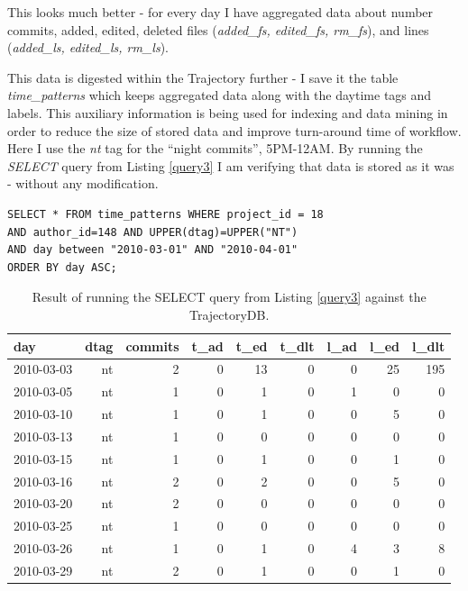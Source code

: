 \documentclass[a4paper,10pt]{article}
\numberwithin{equation}{subsection}
\begin{document}
This looks much better - for every day I have aggregated data about number commits, added, edited, deleted files (\emph{added\_fs, edited\_fs, rm\_fs}),
and lines (\emph{added\_ls, edited\_ls, rm\_ls}).

This data is digested within the Trajectory further - I save it the table \emph{time\_patterns} which keeps aggregated data along with the daytime tags
and labels. This auxiliary information is being used for indexing and data mining in order to reduce the size of stored data and improve turn-around
time of workflow. Here I use the \emph{nt} tag for the ``night commits'', 5PM-12AM. By running the \emph{SELECT} query from Listing \ref{query3} I am 
verifying that data is stored as it was - without any modification.
\noindent\begin{minipage}{\textwidth}
\begin{lstlisting}[label=query3,caption=Data summary from time\_patterns table]
SELECT * FROM time_patterns WHERE project_id = 18
AND author_id=148 AND UPPER(dtag)=UPPER("NT")
AND day between "2010-03-01" AND "2010-04-01"
ORDER BY day ASC;
\end{lstlisting}
\end{minipage}
\begin{table}[h]
\noindent\begin{minipage}{\textwidth}
  \centering
  \caption{Result of running the SELECT query from Listing \ref{query3} against the TrajectoryDB.}
  \begin{tabularx}{0.8\textwidth}{ | X | r | r | r | r | r | r | r | r |}
  \hline           
day & dtag & commits & t\_ad & t\_ed & t\_dlt & l\_ad & l\_ed & l\_dlt\\ 
\hline           
2010-03-03 & nt & 2 & 0 & 13 & 0 & 0 & 25 & 195\\ 
2010-03-05 & nt & 1 & 0 & 1 & 0 & 1 & 0 & 0\\ 
2010-03-10 & nt & 1 & 0 & 1 & 0 & 0 & 5 & 0\\ 
2010-03-13 & nt & 1 & 0 & 0 & 0 & 0 & 0 & 0\\ 
2010-03-15 & nt & 1 & 0 & 1 & 0 & 0 & 1 & 0\\ 
2010-03-16 & nt & 2 & 0 & 2 & 0 & 0 & 5 & 0\\ 
2010-03-20 & nt & 2 & 0 & 0 & 0 & 0 & 0 & 0\\ 
2010-03-25 & nt & 1 & 0 & 0 & 0 & 0 & 0 & 0\\ 
2010-03-26 & nt & 1 & 0 & 1 & 0 & 4 & 3 & 8\\ 
2010-03-29 & nt & 2 & 0 & 1 & 0 & 0 & 1 & 0\\
\hline    
  \end{tabularx}
  \label{prestrings}
\end{minipage}
\end{table}
\end{document}
